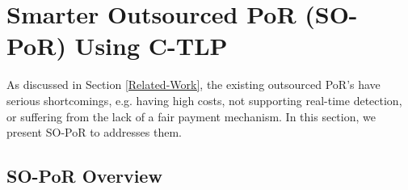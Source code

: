 


\section{Smarter Outsourced PoR (SO-PoR) Using C-TLP}
 As discussed in Section \ref{Related-Work}, the existing outsourced PoR's  have serious shortcomings, e.g. having high costs, not supporting real-time detection, or suffering from the lack of a fair payment mechanism. In this section, we present SO-PoR to addresses them. 
 
 

 
\subsection{SO-PoR Overview} 

 

